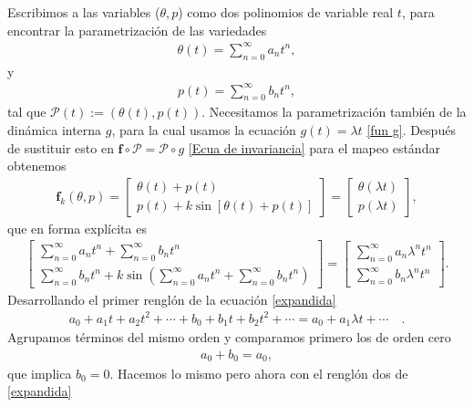 Escribimos a las variables ($\theta,p$) como dos polinomios de variable real $t$, para encontrar la parametrización de las variedades
\begin{eqnarray}
\theta(t)=\sum_{n=0}^{\infty}a_{n}t^{n}  ,
\label{theta}
\end{eqnarray}
y
\begin{eqnarray}
p(t)=\sum_{n=0}^{\infty}b_{n}t^{n},
\label{p}
\end{eqnarray}
tal que $\mathcal{P}(t):=(\theta(t),p(t))$. Necesitamos la parametrización también de la dinámica interna $g$, para la cual usamos la ecuación $g(t)=\lambda t$ \eqref{fun g}. Después de sustituir esto en $\mathbf{f}\circ\mathcal{P}=\mathcal{P}\circ g$ \eqref{Ecua de invariancia} para el mapeo estándar obtenemos
\begin{eqnarray}
\mathbf{f}_{k}(\theta,p) = \left[\begin{array}{c}
\theta(t) + p(t) \\
p(t) + k\sin[\theta(t) +p(t)]
\end{array}\right] =\left[ \begin{array}{c}
\theta(\lambda t) \\
p(\lambda t)
\end{array}\right], 
\label{sumas en mapeo}
\end{eqnarray}
que en forma explícita es
\begin{eqnarray}
\left[\begin{array}{c}
\sum_{n=0}^{\infty}a_{n}t^{n} + \sum_{n=0}^{\infty}b_{n}t^{n} \\
\sum_{n=0}^{\infty}b_{n}t^{n} + k\sin(\sum_{n=0}^{\infty}a_{n}t^{n} + \sum_{n=0}^{\infty}b_{n}t^{n})
\end{array}\right] =\left[ \begin{array}{c}
\sum_{n=0}^{\infty}a_{n}\lambda^{n}t^{n} \\
\sum_{n=0}^{\infty}b_{n}\lambda^{n}t^{n}
\end{array}\right].
\label{expandida}
\end{eqnarray}
Desarrollando el primer renglón de la ecuación \eqref{expandida}
\begin{eqnarray}
a_{0}+a_{1}t+a_{2}t^{2}+\cdots +b_{0}+b_{1}t+b_{2}t^{2}+ \cdots=a_{0}+a_{1}\lambda t+\cdots\quad .
\label{primer renglon}
\end{eqnarray}
Agrupamos términos del mismo orden y comparamos primero los de orden cero
\begin{eqnarray}
a_{0}+b_{0}=a_{0},
\end{eqnarray}
que implica $b_{0}=0$. Hacemos lo mismo pero ahora con el renglón dos de \eqref{expandida} 
